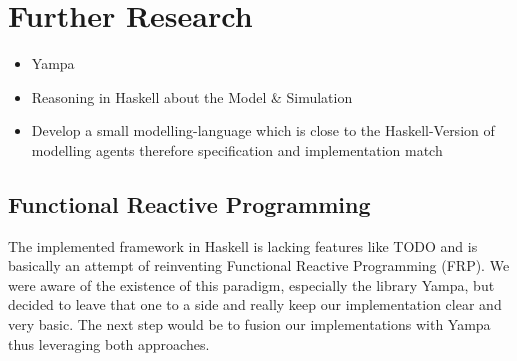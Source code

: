 \section{Further Research}
\begin{itemize}
	\item Yampa
	\item Reasoning in Haskell about the Model \& Simulation
	\item Develop a small modelling-language which is close to the Haskell-Version of modelling agents therefore specification and implementation match
\end{itemize} 


\subsection{Functional Reactive Programming}
The implemented framework in Haskell is lacking features like TODO and is basically an attempt of reinventing Functional Reactive Programming (FRP). We were aware of the existence of this paradigm, especially the library Yampa, but decided to leave that one to a side and really keep our implementation clear and very basic. The next step would be to fusion our implementations with Yampa thus leveraging both approaches.